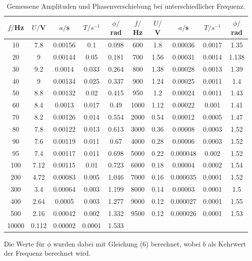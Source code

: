 \begin{table}[H]
\small
  \centering
  \caption{Gemessene Amplituden und Phasenverschiebung bei unterschiedlicher Frequenz.}
  \label{tab:Parameter}
  \begin{tabular}{c c c c c c c c c c}
    \toprule
    $f/$Hz & $U/$V & $a/$s & $T/s^{-1}$ & $\phi/$rad & $f/$Hz & $U/$V & $a/$s & $T/s^{-1}$ & $\phi/$rad \\
    \bottomrule
     10  & 7.8  & 0.00156 & 0.1 & 0.098 & 600 & 1.8 & 0.00036 & 0.0017 & 1.35 \\
     20  & 9 & 0.00144 & 0.05 & 0.181 & 700 & 1.56 & 0.00031 & 0.0014 & 1.138\\
     30  & 9.2& 0.0014 & 0.033 & 0.264 & 800 & 1.38 & 0.00028 & 0.0013 & 1.39\\
     40  & 9 & 0.00134 & 0.025 & 0.337 & 900 & 1.24 & 0.00025 & 0.0011 & 1.4\\
     50  & 8.8 & 0.00132 & 0.02 & 0.415 & 950 & 1.2 & 0.00024 & 0.0011 & 1.43\\
     60  & 8.4 & 0.0013 & 0.017 & 0.49 & 1000  & 1.12 & 0.00022 & 0.001 & 1.41\\
     70  & 8.2 & 0.00126 & 0.014 & 0.554 & 2000  & 0.54 & 0.00012 & 0.0005 & 1.47\\
     80  & 7.8 & 0.00122 & 0.013 & 0.613 & 3000  & 0.36 & 0.00008 & 0.0003 & 1.52\\
     90  & 7.6 & 0.00119 & 0.011 & 0.67 & 4000  & 0.28 & 0.00006 & 0.0003 & 1.52\\
     95  & 7.4 & 0.00117 & 0.011 & 0.698 & 5000  & 0.22 & 0.000048 & 0.002 & 1.52 \\
     100 & 7.12 & 0.00115 & 0.01 & 0.723 & 6000 & 0.18 & 0.00004 & 0.0002 & 1.54\\
     200 & 4.72 & 0.00083 & 0.005 & 1.046 & 7000  & 0.16 & 0.000035 & 0.0001 & 1.52\\
     300 & 3.4 & 0.00064 & 0.003 & 1.199 & 8000  & 0.14 & 0.00003 & 0.0001 & 1.5\\
     400 & 2.64 & 0.0005 & 0.003 & 1.277 & 9000  & 0.12 & 0.000027 & 0.0001 & 1.55\\
     500 & 2.16 & 0.00042 & 0.002 & 1.332 & 9500  & 0.12 & 0.000026 & 0.0001 & 1.53\\
     10000 & 0.112 & 0.00002 & 0.0001 & 1.533\\
    \bottomrule
  \end{tabular}
\end{table}
\noindent Die Werte für $\phi$ wurden dabei mit Gleichung (6) berechnet, wobei $b$ als Kehrwert der Frequenz berechnet wird.


